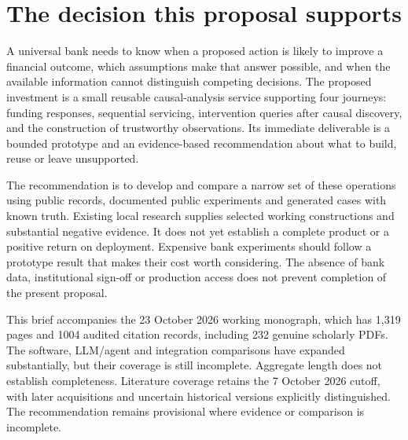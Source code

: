 \hypertarget{the-decision-this-proposal-supports}{%
\section{The decision this proposal
supports}\label{the-decision-this-proposal-supports}}

A universal bank needs to know when a proposed action is likely to
improve a financial outcome, which assumptions make that answer
possible, and when the available information cannot distinguish
competing decisions. The proposed investment is a small reusable
causal-analysis service supporting four journeys: funding responses,
sequential servicing, intervention queries after causal discovery, and
the construction of trustworthy observations. Its immediate deliverable
is a bounded prototype and an evidence-based recommendation about what
to build, reuse or leave unsupported.

The recommendation is to develop and compare a narrow set of these
operations using public records, documented public experiments and
generated cases with known truth. Existing local research supplies
selected working constructions and substantial negative evidence. It
does not yet establish a complete product or a positive return on
deployment. Expensive bank experiments should follow a prototype result
that makes their cost worth considering. The absence of bank data,
institutional sign-off or production access does not prevent completion
of the present proposal. \citep{sp13_scope}

This brief accompanies the 23 October 2026 working monograph, which has
1,319 pages and 1004 audited citation records, including 232 genuine
scholarly PDFs. The software, LLM/agent and integration comparisons have
expanded substantially, but their coverage is still incomplete.
Aggregate length does not establish completeness. Literature coverage
retains the 7 October 2026 cutoff, with later acquisitions and uncertain
historical versions explicitly distinguished. The recommendation remains
provisional where evidence or comparison is incomplete.
\citep{sp23nt_reader,sp23lt_reader,sp23dw_reader,sp23sm_reader,sp22wf_reader,sp22ft_reader,sp22si_reader,sp22ob_reader,sp22dk_reader,sp22iv_reader,sp22bs_reader,sp21rr_reader,sp21pr_reader,sp21gs_reader,sp21eo_reader,sp21tr_reader,sp21ae_reader,sp21gr_reader,sp21ck_reader,sp21cx_reader,sp20md_reader,sp20gf_reader,sp20hy_reader,sp20je_reader,sp20nc_reader,sp20gc_reader,sp20ea_reader,sp20vm_reader,sp20pye_reader,sp20fx_reader,sp20pa_reader,sp20rfx_reader}

